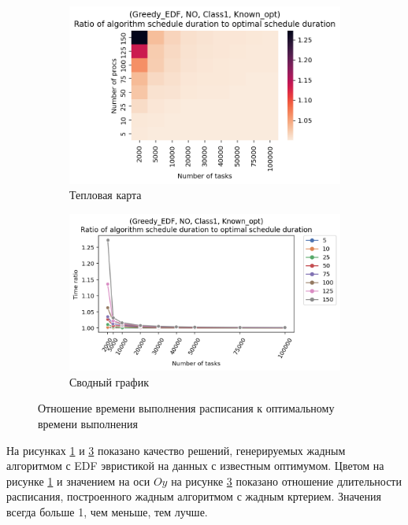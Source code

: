 \begin{figure}[!htbp]
    \centering
    \begin{subfigure}{0.49\textwidth}
        \includegraphics[width=\textwidth]{imgs/ideal_1/NO_EDF/th.png}
        \caption{Тепловая карта}
        \label{fig:NO-EDF-times-heatmap}
    \end{subfigure}
    \hfill
    \begin{subfigure}{0.49\textwidth}
        \includegraphics[width=\textwidth]{imgs/ideal_1/NO_EDF/gr_amalgamated.png}
        \caption{Сводный график} 
        \label{fig:NO-EDF-times-compiled}
    \end{subfigure}
    \caption{Отношение времени выполнения расписания к оптимальному времени выполнения}
\end{figure}

На рисунках \ref{fig:NO-EDF-times-heatmap} и \ref{fig:NO-EDF-times-compiled} показано качество решений, генерируемых жадным алгоритмом с EDF эвристикой на данных с известным оптимумом. Цветом на рисунке \ref{fig:NO-EDF-times-heatmap} и значением на оси $Oy$ на рисунке \ref{fig:NO-EDF-times-compiled} показано отношение длительности расписания, построенного жадным алгоритмом с жадным кртерием. Значения всегда больше 1, чем меньше, тем лучше.


